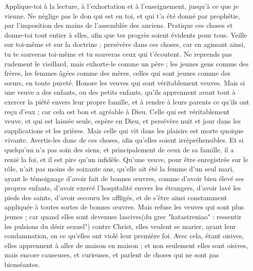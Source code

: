 \begin{multicols}{2}
Applique-toi à la lecture, à l'exhortation et à l’enseignement, jusqu'à ce que je vienne.
Ne néglige pas le don qui est en toi, et qui t'a été donné par prophétie, par l'imposition des mains de l’assemblée des anciens.
Pratique ces choses et donne-toi tout entier à elles, afin que tes progrès soient évidents pour tous.
Veille sur toi-même et sur la doctrine ; persévère dans ces choses, car en agissant ainsi, tu te sauveras toi-même et tu sauveras ceux qui t'écoutent.
\VerseOne{}Ne reprends pas rudement le vieillard, mais exhorte-le comme un père ; les jeunes gens comme des frères,
les femmes âgées comme des mères, celles qui sont jeunes comme des sœurs, en toute pureté.
Honore les veuves qui sont véritablement veuves.
Mais si une veuve a des enfants, ou des petits enfants, qu'ils apprennent avant tout à exercer la piété envers leur propre famille, et à rendre à leurs parents ce qu’ils ont reçu d’eux ; car cela est bon et agréable à Dieu.
Celle qui est véritablement veuve, et qui est laissée seule, espère en Dieu, et persévère nuit et jour dans les supplications et les prières.
Mais celle qui vit dans les plaisirs est morte quoique vivante.
Avertis-les donc de ces choses, afin qu'elles soient irrépréhensibles.
Et si quelqu'un n'a pas soin des siens, et principalement de ceux de sa famille, il a renié la foi, et il est pire qu'un infidèle.
Qu’une veuve, pour être enregistrée sur le rôle, n’ait pas moins de soixante ans, qu’elle ait été la femme d’un seul mari,
ayant le témoignage d'avoir fait de bonnes œuvres, comme d'avoir bien élevé ses propres enfants, d'avoir exercé l’hospitalité envers les étrangers, d'avoir lavé les pieds des saints, d'avoir secouru les affligés, et de s'être ainsi constamment appliquée à toutes sortes de bonnes œuvres.
Mais refuse les veuves qui sont plus jeunes ; car quand elles sont devenues lascives(du grec "katastreniao" : ressentir les pulsions du désir sexuel") contre Christ, elles veulent se marier,
ayant leur condamnation, en ce qu’elles ont violé leur première foi.
Avec cela, étant oisives, elles apprennent à aller de maison en maison ; et non seulement elles sont oisives, mais encore causeuses, et curieuses, et parlent de choses qui ne sont pas bienséantes.

\end{multicols}
